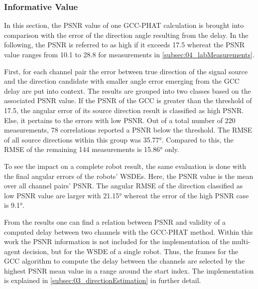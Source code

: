 \subsubsection*{Informative Value}

In this section, the \ac{PSNR} value of one \ac{GCC-PHAT} calculation is brought
into comparison with the error of the direction angle resulting from the delay.
In the following, the \ac{PSNR} is referred to as high if it exceeds 17.5
whereat the \ac{PSNR} value ranges from 10.1 to 28.8 for measurements in
\cref{subsec:04_labMeasurements}.

First, for each channel pair the error between true direction of the signal source
and the direction candidate with smaller angle error emerging from the \ac{GCC}
delay are put into context.
The results are grouped into two classes based on the associated \ac{PSNR} value.
If the \ac{PSNR} of the \ac{GCC} is greater than the threshold of 17.5,
the angular error of its source direction result is classified as high \ac{PSNR}.
Else, it pertains to the errors with low \ac{PSNR}.
Out of a total number of 220 measurements, 78 correlations reported a
\ac{PSNR} below the threshold. The \ac{RMSE} of all source directions within this
group was 35.77\si{\degree}.
Compared to this, the \ac{RMSE} of the remaining 144 measurements
is 15.86\si{\degree} only.

To see the impact on a complete robot result, the same evaluation is done
with the final angular errors of the robots' \acp{WSDE}.
Here, the \ac{PSNR} value is the mean over all channel pairs' \acs{PSNR}.
The angular \ac{RMSE} of the direction classified as low \ac{PSNR} value
are larger with 21.15\si{\degree} whereat the error of the high \ac{PSNR} case
is 9.1\si{\degree}.

From the results one can find a relation between \ac{PSNR} and validity of a
computed delay between two channels with the \ac{GCC-PHAT} method.
Within this work the  \ac{PSNR} information is not included for the implementation
of the multi-agent decision, but for the \ac{WSDE} of a single robot.
Thus, the frames for the \ac{GCC} algorithm to compute the delay between the channels
are selected by the highest \ac{PSNR} mean value in a range around the start index.
The implementation is explained in \cref{subsec:03_directionEstimation} in further detail.
